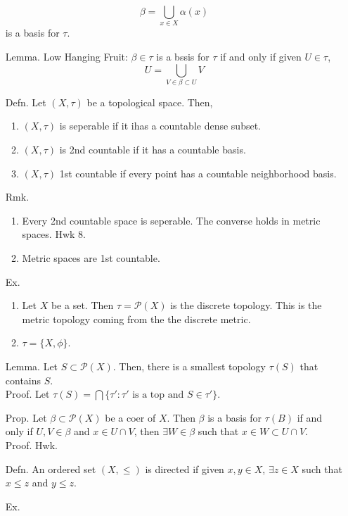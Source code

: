 \documentclass[12pt]{article}
\begin{document}
\begin{itemize}
    \[ \beta = \bigcup_{x \in X} \alpha(x) \]
    is a basis for $\tau$.  
    \item[Lemma.] Low Hanging Fruit: $\beta \in \tau$ is a bssis for $\tau$ if and only if given $U \in \tau$, 
    \[ U = \bigcup_{V \in \beta \subset U} V\]
    \item[Defn.] Let $(X, \tau)$ be a topological space. Then, 
    \begin{enumerate}
        \item $(X, \tau)$ is seperable if it ihas a countable dense subset. 
        \item $(X, \tau)$ is 2nd countable if it has a countable basis.
        \item $(X, \tau)$ 1st countable if every point has a countable neighborhood basis.
    \end{enumerate}
    \item[Rmk.] \begin{enumerate}
        \item Every 2nd countable space is seperable. The converse holds in metric spaces. Hwk 8. 
        \item Metric spaces are 1st countable. 
    \end{enumerate}
    \item[Ex.] \begin{enumerate}
        \item Let $X$ be a set. Then $\tau = \mathcal{P}(X)$ is the discrete topology. This is the metric topology coming from the the discrete metric. 
        \item $\tau = \{X, \phi\}$. 
    \end{enumerate}
    \item[Lemma.] Let $S \subset \mathcal{P}(X)$. Then, there is a smallest topology $\tau(S)$ that contains $S$. \\
    Proof. Let $\tau(S) = \bigcap\{\tau' : \tau' \text{ is a top and } S \in \tau'\}$. 
    \item[Prop.] Let $\beta \subset \mathcal{P}(X)$ be a coer of $X$. Then $\beta$ is a basis for $\tau(B)$ if and only if $U, V \in \beta$ and $x \in U \cap V$, then $\exists W \in \beta$ such that $x \in W \subset U \cap V$. \\
    Proof. Hwk. 
    \newpage 
    \item[Defn.] An ordered set $(X, \leq)$ is directed if given $x, y \in X$, $\exists z \in X$ such that $x \leq z$ and $y \leq z$.
    \item[Ex.] \begin{itemize}

\end{itemize}
\end{itemize}
\end{document}

